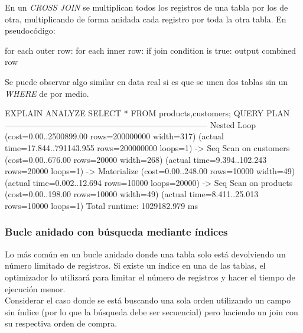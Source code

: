 En un \textit{CROSS JOIN} se multiplican todos los registros de una tabla por los de otra, multiplicando de forma anidada cada registro por toda la otra tabla. En pseudocódigo:\\

\begin{pyglist}
for each outer row:
    for each inner row:
        if join condition is true:
           output combined row
\end{pyglist}

Se puede observar algo similar en data real si es que se unen dos tablas sin un \textit{WHERE} de por medio.

\begin{pyglist}
EXPLAIN ANALYZE SELECT * FROM products,customers;
                      QUERY PLAN                                                        
--------------------------------------------------------------------------
 Nested Loop  (cost=0.00..2500899.00 rows=200000000 width=317) 
              (actual time=17.844..791143.955 rows=200000000 loops=1)
   ->  Seq Scan on customers  (cost=0.00..676.00 rows=20000 width=268)
                  (actual time=9.394..102.243 rows=20000 loops=1)
   ->  Materialize  (cost=0.00..248.00 rows=10000 width=49)
              (actual time=0.002..12.694 rows=10000 loops=20000)
         ->  Seq Scan on products  (cost=0.00..198.00 rows=10000 width=49) 
                          (actual time=8.411..25.013 rows=10000 loops=1)
 Total runtime: 1029182.979 ms

\end{pyglist}


\subsubsection{Bucle anidado con búsqueda mediante índices} 

Lo más común en un bucle anidado donde una tabla solo está devolviendo un número limitado de registros. Si existe un índice en una de las tablas, el optimizador lo utilizará para limitar el número de registros y hacer el tiempo de ejecución menor.\\

Considerar el caso donde se está buscando una sola orden utilizando un campo sin índice (por lo que la búsqueda debe ser secuencial) pero haciendo un join con su respectiva orden de compra.\\

